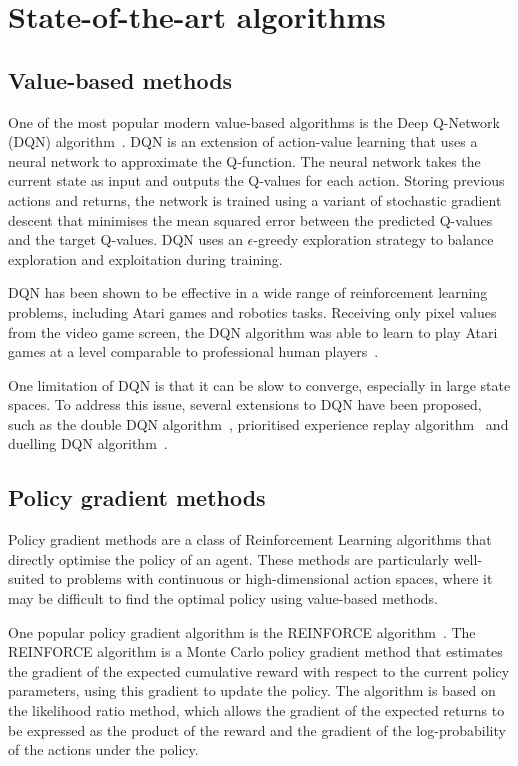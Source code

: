 \section{State-of-the-art algorithms}
\label{sec:rl_algs}

\subsection{Value-based methods}
One of the most popular modern value-based algorithms is the Deep Q-Network (DQN) algorithm~\autocite{mnih2013}.
DQN is an extension of action-value learning that uses a neural network to approximate the Q-function.
The neural network takes the current state as input and outputs the Q-values for each action.
Storing previous actions and returns, the network is trained using a variant of stochastic gradient descent that minimises the mean squared error between the predicted Q-values and the target Q-values.
DQN uses an $\epsilon$-greedy exploration strategy to balance exploration and exploitation during training.

DQN has been shown to be effective in a wide range of reinforcement learning problems, including Atari games and robotics tasks.
Receiving only pixel values from the video game screen, the DQN algorithm was able to learn to play Atari games at a level comparable to professional human players~\autocite{mnih2015}.

One limitation of DQN is that it can be slow to converge, especially in large state spaces.
To address this issue, several extensions to DQN have been proposed, such as the double DQN algorithm~\autocite{hasselt2016}, prioritised experience replay algorithm~\autocite{schaul2015} and duelling DQN algorithm~\autocite{wang2016}.

\subsection{Policy gradient methods}
Policy gradient methods are a class of Reinforcement Learning algorithms that directly optimise the policy of an agent.
These methods are particularly well-suited to problems with continuous or high-dimensional action spaces, where it may be difficult to find the optimal policy using value-based methods.

One popular policy gradient algorithm is the REINFORCE algorithm~\autocite{williams1992}.
The REINFORCE algorithm is a Monte Carlo policy gradient method that estimates the gradient of the expected cumulative reward with respect to the current policy parameters, using this gradient to update the policy.
The algorithm is based on the likelihood ratio method, which allows the gradient of the expected returns to be expressed as the product of the reward and the gradient of the log-probability of the actions under the policy.

